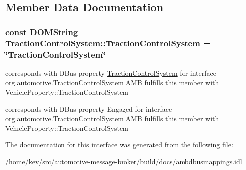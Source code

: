 \subsection{Member Data Documentation}
\hypertarget{interfaceTractionControlSystem_afa6b052fdb3c23cb965a73e93bd34400}{
\subsubsection[{Traction\+Control\+System}]{\setlength{\rightskip}{0pt plus 5cm}const D\+O\+M\+String Traction\+Control\+System\+::\+Traction\+Control\+System = \char`\"{}Traction\+Control\+System\char`\"{}}}\label{interfaceTractionControlSystem_afa6b052fdb3c23cb965a73e93bd34400}


corresponds with D\+Bus property \hyperlink{interfaceTractionControlSystem}{Traction\+Control\+System} for interface org.\+automotive.\+Traction\+Control\+System A\+M\+B fulfills this member with Vehicle\+Property\+::\+Traction\+Control\+System 

corresponds with D\+Bus property Engaged for interface org.\+automotive.\+Traction\+Control\+System A\+M\+B fulfills this member with Vehicle\+Property\+::\+Traction\+Control\+System 

The documentation for this interface was generated from the following file\+:\begin{DoxyCompactItemize}
\item 
/home/kev/src/automotive-\/message-\/broker/build/docs/\hyperlink{ambdbusmappings_8idl}{ambdbusmappings.\+idl}\end{DoxyCompactItemize}
